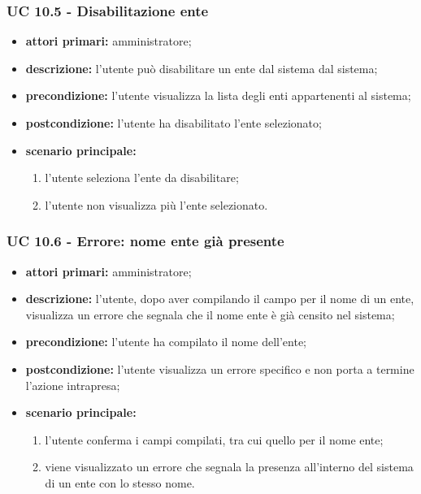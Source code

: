 			\subsubsection{UC 10.5 - Disabilitazione ente}
			\begin{itemize}
				\item \textbf{attori primari:} amministratore;
				\item \textbf{descrizione:} l'utente può disabilitare un ente dal sistema dal sistema;
				\item \textbf{precondizione:} l'utente visualizza la lista degli enti appartenenti al sistema;
				\item \textbf{postcondizione:} l'utente ha disabilitato l'ente selezionato;
				\item \textbf{scenario principale:}
				\begin{enumerate}
					\item{l'utente seleziona l'ente da disabilitare;}
					\item{l'utente non visualizza più l'ente selezionato.}
				\end{enumerate}
			\end{itemize}

			\subsubsection{UC 10.6 - Errore: nome ente già presente}
			\begin{itemize}
				\item \textbf{attori primari:} amministratore;
				\item \textbf{descrizione:} l'utente, dopo aver compilando il campo per il nome di un ente, visualizza un errore che segnala che il nome ente è già censito nel sistema;
				\item \textbf{precondizione:} l'utente ha compilato il nome dell'ente;
				\item \textbf{postcondizione:} l'utente visualizza un errore specifico e non porta a termine l'azione intrapresa;
				\item \textbf{scenario principale:}
				\begin{enumerate}
					\item{l'utente conferma i campi compilati, tra cui quello per il nome ente;}
					\item{viene visualizzato un errore che segnala la presenza all'interno del sistema di un ente con lo stesso nome.}
				\end{enumerate}
			\end{itemize}			

